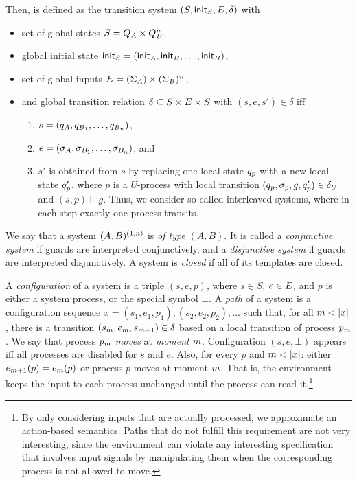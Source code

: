 Then, \largesys is defined as the transition 
system $(S,{\sf init}_S,E,\delta)$ with 
\begin{itemize}
\item set of global states $S = \stateset_A \times \stateset_B^{n}$, 
\item global initial state ${\sf init}_S = ({\sf init}_A,{\sf init}_B,\ldots,{\sf init}_B)$, 
\item set of global inputs $E = (\Sigma_A) \times (\Sigma_B)^{n}$,
\item and global transition relation $\delta \subseteq S \times E \times S$ with $(s,e,s') \in \delta$ iff 
\begin{enumerate}[label=\roman*)] 
  \item $s=(q_A,q_{B_1},\ldots,q_{B_n})$, 
  \item $e=(\sigma_A, \sigma_{B_1},\ldots,\sigma_{B_n})$, and 
  \item $s'$ is obtained from $s$ by replacing one local state $q_p$ with a new local state $q_p'$, where $p$ is a $U$-process with local transition $(q_{p},\sigma_{p},g,q_p') \in \delta_U$ and $(s,p) \models g$. 
        Thus, we consider so-called interleaved systems,
        where in each step exactly one process transits.
\end{enumerate}
\end{itemize}
We say that a system $(A,B)^{(1,n)}$ is \emph{of type} $(A,B)$. It is called a
\emph{conjunctive system} if guards are interpreted conjunctively, and a
\emph{disjunctive system} if guards are interpreted disjunctively. 
A system is \emph{closed} if all of its templates are closed.


A \emph{configuration} of a system is a triple $(s,e,p)$, where $s \in S$, $e 
\in E$, and $p$ is either a system process, or the special symbol $\bot$.
 A \emph{path} of a system is a configuration sequence 
$x = (s_1,e_1,p_1),(s_2,e_2,p_2),\ldots$ such that, for all $m < |x|$, there is a 
transition $(s_m,e_m,s_{m+1}) \in \delta$ based on a local 
transition of process $p_m$. We say that process 
$p_m$ \emph{moves} at \emph{moment} $m$. 
Configuration $(s,e,\bot)$ appears
 iff all processes are disabled for $s$ and $e$.
Also, for every $p$ and $m < |x|$: 
either $e_{m+1}(p) = e_m(p)$ or process $p$ moves at moment $m$. 
That is, the environment keeps the input to each process unchanged until 
the process can read it.\footnote{By only considering inputs that are actually processed, we 
approximate an 
action-based semantics. Paths that do not fulfill this requirement are not 
very interesting, since the environment can violate any interesting 
specification that involves input signals by manipulating them when the 
corresponding process is not allowed to move.} 

